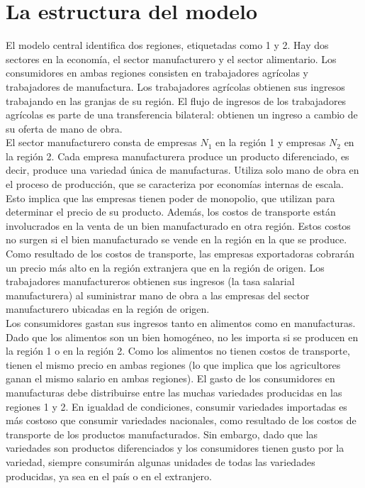 \section{La estructura del modelo}

El modelo central identifica dos regiones, etiquetadas como 1 y 2. Hay dos sectores en la economía, el sector manufacturero y el sector alimentario. Los consumidores en ambas regiones consisten en trabajadores agrícolas y trabajadores de manufactura. Los trabajadores agrícolas obtienen sus ingresos trabajando en las granjas de su región. El flujo de ingresos de los trabajadores agrícolas es parte de una transferencia bilateral: obtienen un ingreso a cambio de su oferta de mano de obra.\\
El sector manufacturero consta de empresas $N_1$ en la región 1 y empresas $N_2$ en la región 2. Cada empresa manufacturera produce un producto diferenciado, es decir, produce una variedad única de manufacturas. Utiliza solo mano de obra en el proceso de producción, que se caracteriza por economías internas de escala. Esto implica que las empresas tienen poder de monopolio, que utilizan para determinar el precio de su producto. Además, los costos de transporte están involucrados en la venta de un bien manufacturado en otra región. Estos costos no surgen si el bien manufacturado se vende en la región en la que se produce. Como resultado de los costos de transporte, las empresas exportadoras cobrarán un precio más alto en la región extranjera que en la región de origen. Los trabajadores manufactureros obtienen sus ingresos (la tasa salarial manufacturera) al suministrar mano de obra a las empresas del sector manufacturero ubicadas en la región de origen.\\
Los consumidores gastan sus ingresos tanto en alimentos como en manufacturas. Dado que los alimentos son un bien homogéneo, no les importa si se producen en la región 1 o en la región 2. Como los alimentos no tienen costos de transporte, tienen el mismo precio en ambas regiones (lo que implica que los agricultores ganan el mismo salario en ambas regiones). El gasto de los consumidores en manufacturas debe distribuirse entre las muchas variedades producidas en las regiones 1 y 2. En igualdad de condiciones, consumir variedades importadas es más costoso que consumir variedades nacionales, como resultado de los costos de transporte de los productos manufacturados. Sin embargo, dado que las variedades son productos diferenciados y los consumidores tienen gusto por la variedad, siempre consumirán algunas unidades de todas las variedades producidas, ya sea en el país o en el extranjero.\\

